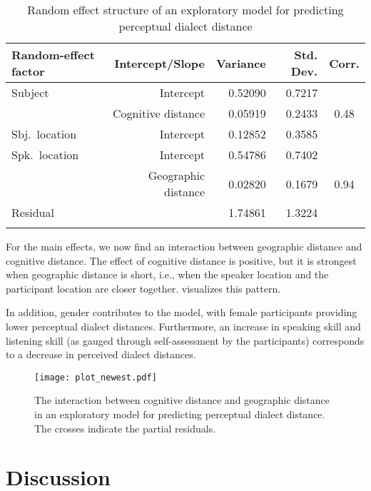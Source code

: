 \documentclass[output=paper,colorlinks,citecolor=brown,draft]{langscibook}
\begin{document}
\begin{table}
\caption{Random effect structure of an exploratory model for predicting perceptual dialect distance}
\label{tab:res_exp}
 \begin{tabular}{lrrrc}
  \lsptoprule
    Random-effect factor & Intercept/Slope & Variance & Std. Dev. & Corr. \\
  \midrule
    Subject	& Intercept	& 0.52090 & 0.7217 & \\  	
     & Cognitive distance & 0.05919  & 0.2433  & 0.48\\
    Sbj.~location & Intercept & 0.12852 & 0.3585 & \\	
    Spk.~location & Intercept & 0.54786 & 0.7402	& \\
     & Geographic distance & 0.02820 & 0.1679 & 0.94\\
     Residual & & 1.74861 & 1.3224 & \\
  \lspbottomrule
 \end{tabular}
\end{table}

For the main effects, we now find an interaction between geographic distance and cognitive distance. The effect of cognitive distance is positive, but it is strongest when geographic distance is short, i.e., when the speaker location and the participant location are closer together.  visualizes this pattern. 

In addition, gender contributes to the model, with female participants providing lower perceptual dialect distances. Furthermore, an increase in speaking skill and listening skill (as gauged through self-assessment by the participants) corresponds to a decrease in perceived dialect distances. 

\begin{figure}
    \texttt{[image: plot\_newest.pdf]}
    \caption{The interaction between cognitive distance and geographic distance in an exploratory model for predicting perceptual dialect distance. The crosses indicate the partial residuals.}
    \label{fig:interaction}
\end{figure}

\section{Discussion}
\end{document}
